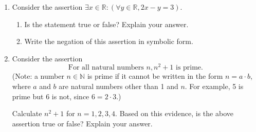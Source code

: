 \documentclass[12pt]{article}
\newcommand{\points}[1]{\marginpar{\hspace{24pt}[#1]}}
\newcommand{\R}{\mathbb{R}}
\begin{document}
\thispagestyle{fancy}

 \begin{enumerate}
 \item  Consider the assertion $\exists x\in\R: (\forall y\in\R, 2x-y=3)$.
\begin{enumerate}
 \item Is the statement true or false? Explain your answer. \points{3}

\vspace{3.5in}

 \item Write the negation of this assertion in symbolic form. \points{3}
\end{enumerate}
\newpage

\item Consider the assertion
\points{4}
\[
 \text{For all natural numbers } n, n^2+1 \text{ is prime.}
\]
(Note: a number $n\in\mathbb{N}$ is prime if it cannot be written in the form $n=a\cdot b$, where $a$ and $b$ are natural numbers other than 1 and $n$. For example, 5 is prime but 6 is not, since $6=2\cdot 3$.)

Calculate $n^2+1$ for $n=1,2,3,4.$ Based on this evidence, is the above assertion true or false? Explain your answer.
 \end{enumerate}
\end{document}
